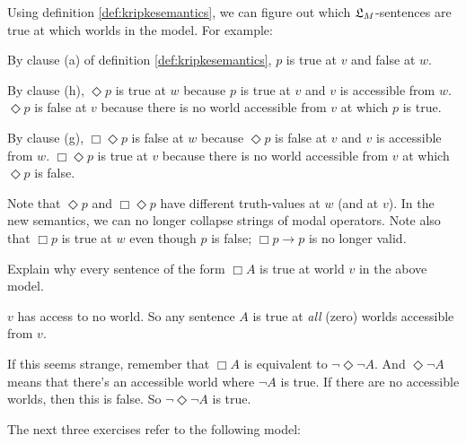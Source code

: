 \begin{center}
\end{center}
%
Using definition \ref{def:kripkesemantics}, we can figure out which $\mathfrak{L}_M$-sentences
are true at which worlds in the model. For example:

\begin{itemize*}
  \item By clause (a) of definition \ref{def:kripkesemantics}, $p$ is true at
  $v$ and false at $w$.
  \item By clause (h), $\Diamond p$ is true at $w$ because $p$ is true at $v$
  and $v$ is accessible from $w$. $\Diamond p$ is false at $v$ because there is
  no world accessible from $v$ at which $p$ is true.
  \item By clause (g), $\Box\Diamond p$ is false at $w$ because $\Diamond p$ is
  false at $v$ and $v$ is accessible from $w$. $\Box\Diamond p$ is true at $v$
  because there is no world accessible from $v$ at which $\Diamond p$ is false.
\end{itemize*}
%
Note that $\Diamond p$ and $\Box \Diamond p$ have different truth-values at $w$
(and at $v$). In the new semantics, we can no longer collapse strings of modal
operators. Note also that $\Box p$ is true at $w$ even though $p$ is false;
$\Box p \to p$ is no longer valid.

\begin{exercise}
  Explain why every sentence of the form $\Box A$ is true at world $v$
  in the above model.
\end{exercise}
\begin{solution}
  $v$ has access to no world. So any sentence $A$ is true at
  \emph{all} (zero) worlds accessible from $v$.

  If this seems strange, remember that $\Box A$ is equivalent to
  $\neg \Diamond \neg A$. And $\Diamond \neg A$ means that there's an
  accessible world where $\neg A$ is true. If there are no accessible
  worlds, then this is false. So $\neg \Diamond \neg A$ is true.
\end{solution}

The next three exercises refer to the following model:
%
\begin{center}
\end{center}


